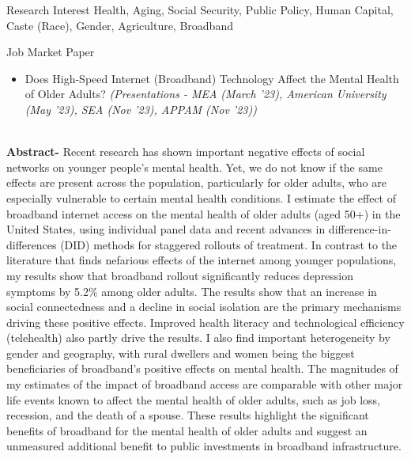\documentclass{resume} %
\begin{document}

\begin{rSection}{Research Interest}
Health, Aging, Social Security, Public Policy, Human Capital, Caste (Race), Gender, Agriculture, Broadband
\end{rSection}


\begin{rSection}{Job Market Paper}
\begin{itemize}
\item Does High-Speed Internet (Broadband) Technology Affect the Mental Health of Older Adults? \textit{\scriptsize{(Presentations - MEA (March '23), American University (May '23), SEA (Nov '23), APPAM (Nov '23))}}
\end{itemize}
\\
\textbf{Abstract-} 
Recent research has shown important negative effects of social networks on younger people's mental health. Yet, we do not know if the same effects are present across the population, particularly for older adults, who are especially vulnerable to certain mental health conditions.
I estimate the effect of broadband internet access on the mental health of older adults (aged 50+) in the United States, using individual panel data and recent advances in difference-in-differences (DID) methods for staggered rollouts of treatment.
In contrast to the literature that finds nefarious effects of the internet among younger populations, my results show that broadband rollout significantly reduces depression symptoms by 5.2\% among older adults. The results show that an increase in social connectedness and a decline in social isolation are the primary mechanisms driving these positive effects. Improved health literacy and technological efficiency (telehealth) also partly drive the results.
I also find important heterogeneity by gender and geography, with rural dwellers and women being the biggest beneficiaries of broadband's positive effects on mental health. 
The magnitudes of my estimates of the impact of broadband access are comparable with other major life events known to affect the mental health of older adults, such as job loss, recession, and the death of a spouse. These results highlight the significant benefits of broadband for the mental health of older adults and suggest an unmeasured additional benefit to public investments in broadband infrastructure.  

\end{rSection}
\end{document}
